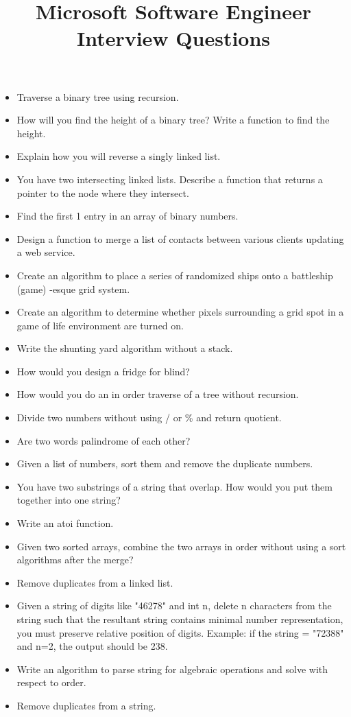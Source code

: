 \documentclass{article}
\begin{document}
\title{Microsoft Software Engineer Interview Questions}
\maketitle
\begin{itemize}
	\item Traverse a binary tree using recursion.
	\item How will you find the height of a binary tree? Write a function to find the height.
	\item Explain how you will reverse a singly linked list. 
	\item You have two intersecting linked lists. Describe a function that returns a pointer to the node where they intersect.
	\item Find the first 1 entry in an array of binary numbers.
	\item Design a function to merge a list of contacts between various clients updating a web service.
	\item Create an algorithm to place a series of randomized ships onto a battleship (game) -esque grid system.
	\item Create an algorithm to determine whether pixels surrounding a grid spot in a game of life environment are turned on.
	\item Write the shunting yard algorithm without a stack.
	\item How would you design a fridge for blind?
	\item How would you do an in order traverse of a tree without recursion.
	\item Divide two numbers without using / or \% and return quotient.
	\item Are two words palindrome of each other?
	\item Given a list of numbers, sort them and remove the duplicate numbers.
	\item You have two substrings of a string that overlap. How would you put them together into one string?
	\item Write an atoi function.
	\item Given two sorted arrays, combine the two arrays in order without using a sort algorithms after the merge?
	\item Remove duplicates from a linked list.
	\item Given a string of digits like "46278" and int n, delete n characters from the string such that the resultant string contains minimal number representation, you must preserve relative position of digits. Example: if the string = "72388" and n=2, the output should be 238.
	\item Write an algorithm to parse string for algebraic operations and solve with respect to order.
	\item Remove duplicates from a string.
	
\end{itemize}
\end{document}
